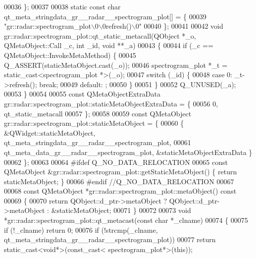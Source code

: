 \begin{DoxyCode}
00036 \};
00037 
00038 \textcolor{keyword}{static} \textcolor{keyword}{const} \textcolor{keywordtype}{char} qt_meta_stringdata_gr__radar__spectrogram_plot[] = \{
00039     \textcolor{stringliteral}{"gr::radar::spectrogram\_plot\(\backslash\)0\(\backslash\)0refresh()\(\backslash\)0"}
00040 \};
00041 
00042 \textcolor{keywordtype}{void} gr::radar::spectrogram\_plot::qt\_static\_metacall(QObject *\_o, QMetaObject::Call \_c, \textcolor{keywordtype}{int} \_id, \textcolor{keywordtype}{void} **\_a)
00043 \{
00044     \textcolor{keywordflow}{if} (\_c == QMetaObject::InvokeMetaMethod) \{
00045         Q\_ASSERT(staticMetaObject.cast(\_o));
00046         spectrogram_plot *\_t = \textcolor{keyword}{static\_cast<}spectrogram_plot *\textcolor{keyword}{>}(\_o);
00047         \textcolor{keywordflow}{switch} (\_id) \{
00048         \textcolor{keywordflow}{case} 0: \_t->refresh(); \textcolor{keywordflow}{break};
00049         \textcolor{keywordflow}{default}: ;
00050         \}
00051     \}
00052     Q\_UNUSED(\_a);
00053 \}
00054 
00055 \textcolor{keyword}{const} QMetaObjectExtraData gr::radar::spectrogram\_plot::staticMetaObjectExtraData = \{
00056     0,  qt\_static\_metacall 
00057 \};
00058 
00059 \textcolor{keyword}{const} QMetaObject gr::radar::spectrogram\_plot::staticMetaObject = \{
00060     \{ &QWidget::staticMetaObject, qt_meta_stringdata_gr__radar__spectrogram_plot,
00061       qt_meta_data_gr__radar__spectrogram_plot, &staticMetaObjectExtraData \}
00062 \};
00063 
00064 \textcolor{preprocessor}{#ifdef Q\_NO\_DATA\_RELOCATION}
00065 \textcolor{keyword}{const} QMetaObject &gr::radar::spectrogram\_plot::getStaticMetaObject() \{ \textcolor{keywordflow}{return} staticMetaObject; \}
00066 \textcolor{preprocessor}{#endif //Q\_NO\_DATA\_RELOCATION}
00067 
00068 \textcolor{keyword}{const} QMetaObject *gr::radar::spectrogram\_plot::metaObject()\textcolor{keyword}{ const}
00069 \textcolor{keyword}{}\{
00070     \textcolor{keywordflow}{return} QObject::d\_ptr->metaObject ? QObject::d\_ptr->metaObject : &staticMetaObject;
00071 \}
00072 
00073 \textcolor{keywordtype}{void} *gr::radar::spectrogram\_plot::qt\_metacast(\textcolor{keyword}{const} \textcolor{keywordtype}{char} *\_clname)
00074 \{
00075     \textcolor{keywordflow}{if} (!\_clname) \textcolor{keywordflow}{return} 0;
00076     \textcolor{keywordflow}{if} (!strcmp(\_clname, qt_meta_stringdata_gr__radar__spectrogram_plot))
00077         \textcolor{keywordflow}{return} \textcolor{keyword}{static\_cast<}\textcolor{keywordtype}{void}*\textcolor{keyword}{>}(\textcolor{keyword}{const\_cast<} spectrogram_plot*\textcolor{keyword}{>}(\textcolor{keyword}{this}));

\end{DoxyCode}
